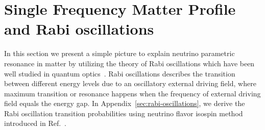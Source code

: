 \documentclass[%
reprint,
 amsmath,amssymb,
 prd,
]{revtex4-1}
\begin{document}



\section{\label{sec:single}Single Frequency Matter Profile and Rabi oscillations}%


In this section we present a simple picture to explain neutrino parametric resonance in matter by utilizing the theory of Rabi oscillations which have been well studied in quantum optics~\cite{Boyd2008}. Rabi oscillations describes the transition between different energy levels due to an oscillatory external driving field, where maximum transition or resonance happens when the frequency of external driving field equals the energy gap. In Appendix~\ref{sec:rabi-oscillations}, we derive the Rabi oscillation transition probabilities using neutrino flavor isospin method introduced in Ref.~.




\end{document}
